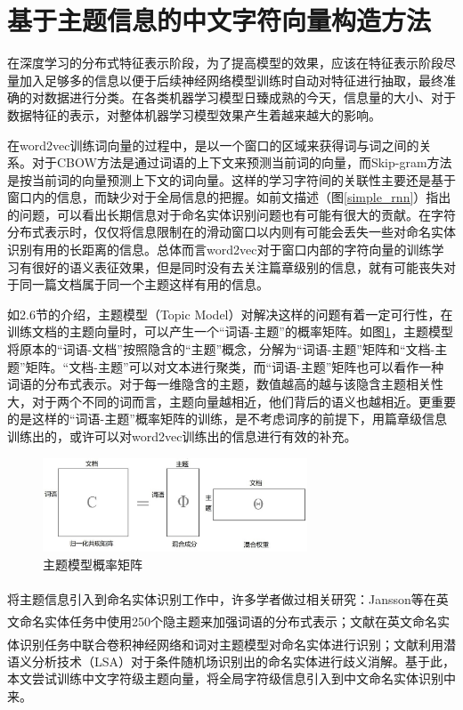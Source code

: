 \documentclass[winfonts,master,oneside,nobackinfo]{njuthesis}
\newcommand{\upcite}[1]{\textsuperscript{\textsuperscript{\cite{#1}}}}
\begin{document}
\section{基于主题信息的中文字符向量构造方法}

在深度学习的分布式特征表示阶段，为了提高模型的效果，应该在特征表示阶段尽量加入足够多的信息以便于后续神经网络模型训练时自动对特征进行抽取，最终准确的对数据进行分类。在各类机器学习模型日臻成熟的今天，信息量的大小、对于数据特征的表示，对整体机器学习模型效果产生着越来越大的影响。

在word2vec训练词向量的过程中，是以一个窗口的区域来获得词与词之间的关系。对于CBOW方法是通过词语的上下文来预测当前词的向量，而Skip-gram方法是按当前词的向量预测上下文的词向量。这样的学习字符间的关联性主要还是基于窗口内的信息，而缺少对于全局信息的把握。如前文描述（图\ref{simple_rnn}）指出的问题，可以看出长期信息对于命名实体识别问题也有可能有很大的贡献。在字符分布式表示时，仅仅将信息限制在的滑动窗口以内则有可能会丢失一些对命名实体识别有用的长距离的信息。总体而言word2vec对于窗口内部的字符向量的训练学习有很好的语义表征效果，但是同时没有去关注篇章级别的信息，就有可能丧失对于同一篇文档属于同一个主题这样有用的信息。

如2.6节的介绍，主题模型（Topic Model）对解决这样的问题有着一定可行性，在训练文档的主题向量时，可以产生一个“词语-主题”的概率矩阵。如图\ref{lda-vec}，主题模型将原本的“词语-文档”按照隐含的“主题”概念，分解为“词语-主题”矩阵和“文档-主题”矩阵。“文档-主题”可以对文本进行聚类，而“词语-主题”矩阵也可以看作一种词语的分布式表示。对于每一维隐含的主题，数值越高的越与该隐含主题相关性大，对于两个不同的词而言，主题向量越相近，他们背后的语义也越相近。更重要的是这样的“词语-主题”概率矩阵的训练，是不考虑词序的前提下，用篇章级信息训练出的，或许可以对word2vec训练出的信息进行有效的补充。

\begin{figure}[H]
\centering
\includegraphics[width=0.7\textwidth]{./figure/主题模型.jpg}
\caption{主题模型概率矩阵}
\label{lda-vec}
\end{figure}
将主题信息引入到命名实体识别工作中，许多学者做过相关研究：Jansson等\upcite{Jansson}在英文命名实体任务中使用250个隐主题来加强词语的分布式表示；文献\upcite{kang}在英文命名实体识别任务中联合卷积神经网络和词对主题模型对命名实体进行识别；文献\upcite{gong}利用潜语义分析技术（LSA）对于条件随机场识别出的命名实体进行歧义消解。基于此，本文尝试训练中文字符级主题向量，将全局字符级信息引入到中文命名实体识别中来。
\end{document}
